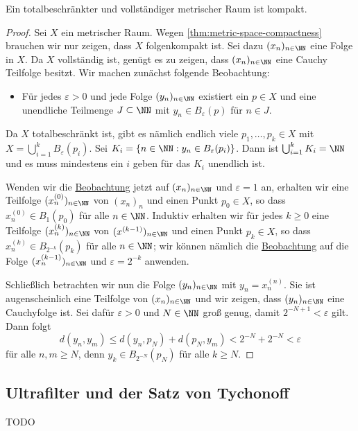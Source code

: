 \begin{theorem}\label{thm:totally-bounded-complete-compact}
Ein totalbeschränkter und vollständiger metrischer Raum ist kompakt.
\end{theorem}
\begin{proof}
  Sei $X$ ein metrischer Raum. Wegen \autoref{thm:metric-space-compactness} brauchen wir nur zeigen, dass $X$ folgenkompakt ist. Sei dazu $(x_n)_{n\in \NN}$ eine Folge in $X$. Da $X$ vollständig ist, genügt es zu zeigen, dass $(x_n)_{n\in\NN}$ eine Cauchy Teilfolge besitzt. Wir machen zunächst folgende Beobachtung:
  \begin{itemize}
    \item\label{observation-1} Für jedes $\varepsilon>0$ und jede Folge $(y_n)_{n\in\NN}$ existiert ein $p\in X$ und eine unendliche Teilmenge $J\subset \NN$ mit $y_n \in B_\varepsilon(p)$ für $n\in J$.
  \end{itemize}
  Da $X$ totalbeschränkt ist, gibt es nämlich endlich viele $p_1,\dots,p_k\in X$ mit $X = \bigcup_{i=1}^k B_\varepsilon(p_i)$. Sei $K_i = \{n\in\NN : y_n\in B_\varepsilon(p_i)\}$. Dann ist $\bigcup_{i=1}^k K_i = \NN$ und es muss mindestens ein $i$ geben für das $K_i$ unendlich ist.

  Wenden wir die \hyperref[observation-1]{Beobachtung} jetzt auf $(x_n)_{n\in\NN}$ und $\varepsilon = 1$ an, erhalten wir eine Teilfolge $(x^{(0)}_n)_{n\in\NN}$ von $(x_n)_n$ und einen Punkt $p_0\in X$, so dass $x^{(0)}_n\in B_1(p_0)$ für alle $n\in\NN$. Induktiv erhalten wir für jedes $k\geq 0$ eine Teilfolge $(x^{(k)}_n)_{n\in\NN}$ von $(x^{(k-1)})_{n\in\NN}$ und einen Punkt $p_k\in X$, so dass $x^{(k)}_n\in B_{2^{-k}}(p_k)$ für alle $n\in \NN$; wir können nämlich die \hyperref[observation-1]{Beobachtung} auf die Folge $(x^{(k-1)}_n)_{n\in\NN}$ und $\varepsilon = 2^{-k}$ anwenden.

  Schließlich betrachten wir nun die Folge $(y_n)_{n\in\NN}$ mit $y_n = x^{(n)}_n$. Sie ist augenscheinlich eine Teilfolge von $(x_n)_{n\in\NN}$ und wir zeigen, dass $(y_n)_{n\in\NN}$ eine Cauchyfolge ist. Sei dafür $\varepsilon > 0$ und $N\in\NN$ groß genug, damit $2^{-N+1} < \varepsilon$ gilt. Dann folgt
  \[
    d(y_n,y_m) \leq d(y_n, p_N) + d(p_N, y_m) < 2^{-N} + 2^{-N} < \varepsilon
  \]
  für alle $n,m \geq N$, denn $y_k\in B_{2^{-N}}(p_N)$ für alle $k\geq N$.
\end{proof}

\subsection{Ultrafilter und der Satz von Tychonoff}
TODO

